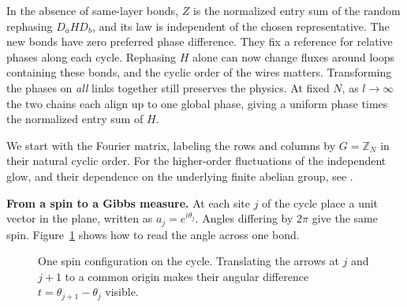 \documentclass[11pt,a4paper]{article}
\theoremstyle{remark}
\begin{document}
In the absence of same-layer bonds, $Z$ is the normalized entry sum of the random rephasing $D_{\bar a}HD_b$, and its law is independent of the chosen representative. The new bonds have zero preferred phase difference. They fix a reference for relative phases along each cycle. Rephasing $H$ alone can now change fluxes around loops containing these bonds, and the cyclic order of the wires matters. Transforming the phases on \emph{all} links together still preserves the physics. At fixed $N$, as $l\to\infty$ the two chains each align up to one global phase, giving a uniform phase times the normalized entry sum of $H$.

We start with the Fourier matrix, labeling the rows and columns by $G=\mathbb Z_N$ in their natural cyclic order. For the higher-order fluctuations of the independent glow, and their dependence on the underlying finite abelian group, see \cite{banica}.

\medskip

\noindent\textbf{From a spin to a Gibbs measure.} 
At each site $j$ of the cycle place a unit vector in the plane, written
as $a_j=e^{i\theta_j}$. Angles differing by $2\pi$ give the same spin.
Figure~\ref{fig:spins} shows how to read the angle across one bond.

\begin{figure}[H]
\centering
{}
\caption{One spin configuration on the cycle. Translating the arrows at
$j$ and $j+1$ to a common origin makes their angular difference
$t=\theta_{j+1}-\theta_j$ visible.}\label{fig:spins}
\end{figure}
\end{document}
